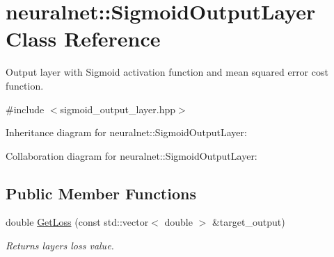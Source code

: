\hypertarget{classneuralnet_1_1SigmoidOutputLayer}{}\section{neuralnet\+:\+:Sigmoid\+Output\+Layer Class Reference}
\label{classneuralnet_1_1SigmoidOutputLayer}


Output layer with Sigmoid activation function and mean squared error cost function.  




{\ttfamily \#include $<$sigmoid\+\_\+output\+\_\+layer.\+hpp$>$}



Inheritance diagram for neuralnet\+:\+:Sigmoid\+Output\+Layer\+:


Collaboration diagram for neuralnet\+:\+:Sigmoid\+Output\+Layer\+:
\subsection*{Public Member Functions}
\begin{DoxyCompactItemize}
\item 
\mbox{\label{classneuralnet_1_1SigmoidOutputLayer_afbcee0550709ea30062d457cf30c94a4}} 
double \hyperlink{classneuralnet_1_1SigmoidOutputLayer_afbcee0550709ea30062d457cf30c94a4}{Get\+Loss} (const std\+::vector$<$ double $>$ \&target\+\_\+output)
\begin{DoxyCompactList}\small\item\em Return\textquotesingle{}s layer\textquotesingle{}s loss value. \end{DoxyCompactList}\end{DoxyCompactItemize}
